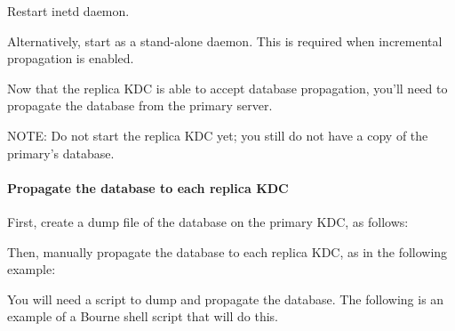 \documentclass[letterpaper,10pt,english]{sphinxmanual}
\begin{document}
Restart inetd daemon.

Alternatively, start {\hyperref[\detokenize{admin/admin_commands/kpropd:kpropd-8}]{}} as a stand-alone daemon.  This is
required when incremental propagation is enabled.

Now that the replica KDC is able to accept database propagation,
you’ll need to propagate the database from the primary server.

NOTE: Do not start the replica KDC yet; you still do not have a copy
of the primary’s database.


\paragraph{Propagate the database to each replica KDC}
\label{\detokenize{admin/install_kdc:kprop-to-replicas}}\label{\detokenize{admin/install_kdc:propagate-the-database-to-each-replica-kdc}}
First, create a dump file of the database on the primary KDC, as
follows:

%
\begin{sphinxVerbatim}[commandchars=\\\{\}]
   
\end{sphinxVerbatim}

Then, manually propagate the database to each replica KDC, as in the
following example:

%
\begin{sphinxVerbatim}[commandchars=\\\{\}]
    

    
\end{sphinxVerbatim}

You will need a script to dump and propagate the database. The
following is an example of a Bourne shell script that will do this.
\end{document}
